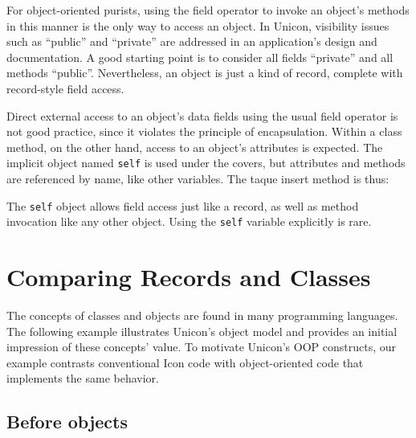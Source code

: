 
For object-oriented purists, using the field operator to invoke an
object's methods in this manner is the only way to
access an object. In Unicon, visibility issues such as
``public'' and ``private'' are addressed in an
application's design and documentation. A good
starting point is to consider all fields
``private'' and all methods ``public''. Nevertheless, an object is just a
kind of record, complete with record-style field access.

Direct external access to an object's data fields using
the usual field operator is not good practice, since it violates the
principle of encapsulation. Within a class method, on the other hand,
access to an object's attributes is expected. The
implicit object named \texttt{self} is used under the covers, but
attributes and methods are referenced by name, like other variables.
The taque insert method is thus:


The \texttt{self} object allows field access just like a record, as well
as method invocation like any other object. Using the \texttt{self}
variable explicitly is rare.

\section{Comparing Records and Classes}

The concepts of classes and objects are found in many programming
languages. The following example illustrates Unicon's object model
and provides an initial impression of these
concepts' value. To motivate Unicon's OOP
constructs, our example contrasts conventional Icon
code with object-oriented code that implements the same behavior.

\subsection*{Before objects}

